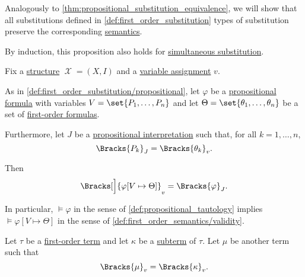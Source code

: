 \begin{proposition}\label{thm:first_order_substitution_equivalence}
  Analogously to \cref{thm:propositional_substitution_equivalence}, we will show that all substitutions defined in \cref{def:first_order_substitution} types of substitution preserve the corresponding \hyperref[def:first_order_semantics]{semantics}.

  By induction, this proposition also holds for \hyperref[def:propositional_substitution]{simultaneous substitution}.

  Fix a \hyperref[def:first_order_structure]{structure} \( \mscrX = (X, I) \) and a \hyperref[def:first_order_valuation/variable_assignment]{variable assignment} \( v \).

  \begin{thmenum}
     As in \cref{def:first_order_substitution/propositional}, let \( \varphi \) be a \hyperref[def:propositional_syntax/formula]{propositional formula} with variables \( {V = \set{ P_1, \ldots, P_n }} \) and let \( \Theta = \set{ \theta_1, \ldots, \theta_n } \) be a set of \hyperref[def:first_order_syntax/formula]{first-order formulas}.

    Furthermore, let \( J \) be a \hyperref[def:propositional_valuation/interpretation]{propositional interpretation} such that, for all \( k = 1, \ldots, n \),
    \begin{equation}\label{eq:thm:first_order_substitution_equivalence/propositional/compatibility}
      \Bracks{P_k}_J = \Bracks{\theta_k}_v.
    \end{equation}

    Then
    \begin{equation}\label{eq:thm:first_order_substitution_equivalence/propositional}
      \Bracks[\Big]{ \varphi[V \mapsto \Theta] }_v = \Bracks{\varphi}_J.
    \end{equation}

    In particular, \( \vDash \varphi \) in the sense of \cref{def:propositional_tautology} implies \( \vDash \varphi[V \mapsto \Theta] \) in the sense of \cref{def:first_order_semantics/validity}.

     Let \( \tau \) be a \hyperref[def:first_order_syntax/term]{first-order term} and let \( \kappa \) be a \hyperref[def:first_order_syntax/subterm]{subterm} of \( \tau \). Let \( \mu \) be another term such that
    \begin{equation}\label{eq:thm:first_order_substitution_equivalence/term_in_term/compatibility}
      \Bracks{\mu}_v = \Bracks{\kappa}_v.
    \end{equation}


\end{thmenum}
\end{proposition}
